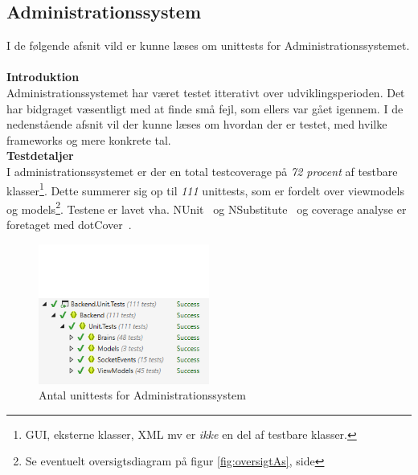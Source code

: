 \subsection{Administrationssystem}
I de følgende afsnit vild er kunne læses om unittests for Administrationssystemet.\\\\


\textbf{Introduktion}\\
Administrationssystemet har været testet itterativt over udviklingsperioden. Det har bidgraget væsentligt med at finde små fejl, som ellers var gået igennem. I de nedenstående afsnit vil der kunne læses om hvordan der er testet, med hvilke frameworks og mere konkrete tal.\\



\textbf{Testdetaljer}\\
I administrationssystemet er der en total testcoverage på \textit{72 procent} af testbare klasser\footnote{GUI, eksterne klasser, XML mv er \textit{ikke} en del af testbare klasser.}. Dette summerer sig op til \textit{111} unittests, som er fordelt over viewmodels og models\footnote{Se eventuelt oversigtsdiagram på figur \ref{fig:oversigtAs}, side \pageref{fig:oversigtAs}}. Testene er lavet vha. NUnit~\cite{NUnit} og NSubstitute~\cite{NSubstitute} og coverage analyse er foretaget med dotCover~\cite{dotCover}.

	\begin{figure}[htb]
		\centering
		\includegraphics[width=0.50\textwidth]{Test/Images/Backend/AntalUnit.png}
		\caption{Antal unittests for Administrationssystem}
		\label{fig:antalunit}
	\end{figure}

